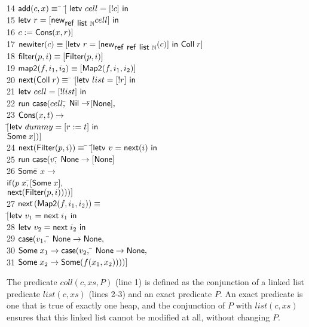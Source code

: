 \documentclass[preprint,natbib]{sigplanconf}
\begin{document}
{\begin{tabbing}
14 \> $\mbox{\textsf{{add}}}(c, x) \equiv$ \=
          $[$\= $\mbox{\textsf{{letv }}}cell = [!c]\mbox{\textsf{{ in }}}$ \\
15 \> \> \> $\mbox{\textsf{{letv }}}r = [\mbox{\textsf{{new}}}_{\mbox{\textsf{{ref }}}\mbox{\textsf{{list }}}{\mathbb{N}}} cell]\mbox{\textsf{{ in }}}$ \\
16 \> \> \> $c := \mbox{\textsf{{Cons}}}(x, r)]$
\\[0.5em]
17 \> $\mbox{\textsf{{new}}}\mbox{\textsf{{iter}}}(c) \equiv 
   [\mbox{\textsf{{letv }}}r = [\mbox{\textsf{{new}}}_{\mbox{\textsf{{ref }}}\mbox{\textsf{{ref }}}\mbox{\textsf{{list }}}{\mathbb{N}}} (c)]\mbox{\textsf{{ in }}}\mbox{\textsf{{Coll}}}\;r]$ 
\\[0.5em]
18 \> $\mbox{\textsf{{filter}}}(p, i) \equiv [\mbox{\textsf{{Filter}}}(p, i)]$ 
\\[0.5em]
19 \> $\mbox{\textsf{{map2}}}(f, i_1, i_2) \equiv [\mbox{\textsf{{Map2}}}(f, i_1, i_2)]$ 
\\[0.5em]
20 \> $\mbox{\textsf{{next}}}(\mbox{\textsf{{Coll}}}\;r) \equiv$ \=
       $[$\=$\mbox{\textsf{{letv }}}list = [!r]\mbox{\textsf{{ in }}}$ \\
21 \>\>\>$\mbox{\textsf{{letv }}}cell = [!list]\mbox{\textsf{{ in }}}$ \\
22 \>\> \>$\mbox{\textsf{{run }}}{}\mbox{\textsf{{case}}}(cell,$\=
            $\mbox{\textsf{{Nil}}} \to $\=$[\mbox{\textsf{{None}}}],$ \\
23 \>\>\>\> $\mbox{\textsf{{Cons}}}(x, t) \to $\\
   \>\>\>\>                   \> $[$\=$\mbox{\textsf{{letv }}}dummy = [r := t]\mbox{\textsf{{ in }}}$ \\
   \>\>\>\>                   \>    \>${\mbox{\textsf{{Some}}}\;x}])]$ \\
24 \> $\mbox{\textsf{{next}}}(\mbox{\textsf{{Filter}}}(p, i)) \equiv$ \= 
        $[$\=$\mbox{\textsf{{letv }}}v = \mbox{\textsf{{next}}}(i)\mbox{\textsf{{ in }}}$ \\
25 \>\>\>$\mbox{\textsf{{run }}}{}\mbox{\textsf{{case}}}(v,$\=
            $\mbox{\textsf{{None}}} \to [\mbox{\textsf{{None}}}]$ \\
26 \>\>\>\> $\mbox{\textsf{{Some}}}$\=$\;x \to $ \\
   \>\>\>\> \>$\mbox{\textsf{{if}}}(p\;x,$\=$[\mbox{\textsf{{Some}}}\; x],$ \\
   \>\>\>\> \>\>                                   $\mbox{\textsf{{next}}}(\mbox{\textsf{{Filter}}}(p, i))))]$
\\
27 \> $\mbox{\textsf{{next}}}$\=$(\mbox{\textsf{{Map2}}}(f, i_1, i_2)) \equiv$ \\
   \>\>$[$\=$\mbox{\textsf{{letv }}}v_1 = \mbox{\textsf{{next}}}\;i_1\mbox{\textsf{{ in }}}$ \\
28 \>\>\>$\mbox{\textsf{{letv }}}v_2 = \mbox{\textsf{{next}}}\;i_2\mbox{\textsf{{ in }}}$ \\
29 \>\>\>$\mbox{\textsf{{case}}}(v_1,$ \= 
            $\mbox{\textsf{{None}}} \to \mbox{\textsf{{None}}},$ \\
30 \>\>\>\> $\mbox{\textsf{{Some}}}\;x_1 \to \mbox{\textsf{{case}}}(v_2,$ \=
              $\mbox{\textsf{{None}}} \to \mbox{\textsf{{None}}},$ \\
31 \>\>\>\>\> $\mbox{\textsf{{Some}}}\;x_2 \to \mbox{\textsf{{Some}}}(f(x_1, x_2))))]$\\
\end{tabbing}
}
The predicate $coll(c, xs, P)$ (line 1) is defined as the conjunction
of a linked list predicate $list(c, xs)$ (lines 2-3) and an exact
predicate $P$. An exact predicate is one that is true of exactly one
heap, and the conjunction of $P$ with $list(c,xs)$ ensures that this
linked list cannot be modified at all, without changing $P$.
\end{document}
